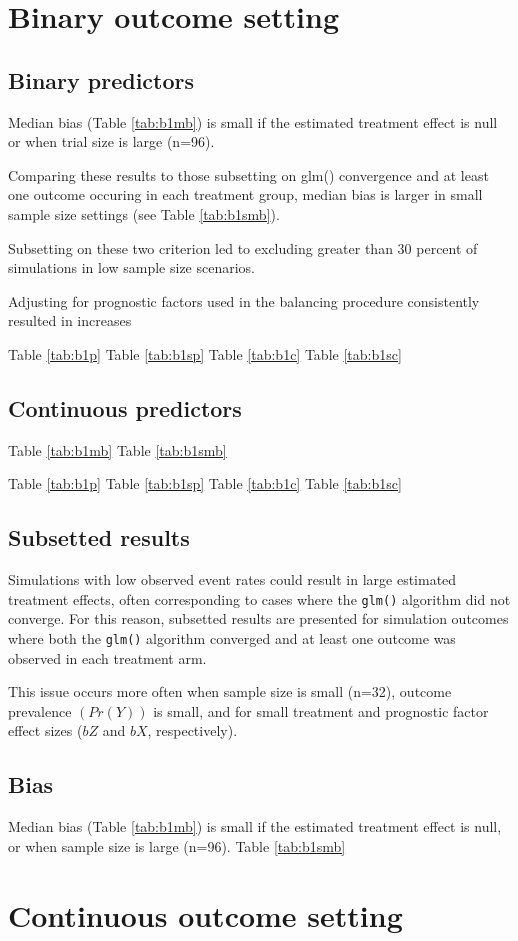\section{Binary outcome setting}
\subsection{Binary predictors}
Median bias (Table \ref{tab:b1mb}) is small if the estimated treatment effect is null or when trial size is large (n=96).

Comparing these results to those subsetting on glm() convergence and at least one outcome occuring in each treatment group,  median bias is larger in small sample size settings (see Table \ref{tab:b1smb}).

Subsetting on these two criterion led to excluding greater than 30 percent of simulations in low sample size scenarios.

Adjusting for prognostic factors used in the balancing procedure consistently resulted in increases 

Table \ref{tab:b1p}
Table \ref{tab:b1sp}
Table \ref{tab:b1c}
Table \ref{tab:b1sc}

\subsection{Continuous predictors}
Table \ref{tab:b1mb}
Table \ref{tab:b1smb}

Table \ref{tab:b1p}
Table \ref{tab:b1sp}
Table \ref{tab:b1c}
Table \ref{tab:b1sc}


\subsection{Subsetted results}
Simulations with low observed event rates could result in large estimated treatment effects, often corresponding to cases where the \texttt{glm()} algorithm did not converge.
For this reason, subsetted results are presented for simulation outcomes where both the \texttt{glm()} algorithm converged and at least one outcome was observed in each treatment arm.

This issue occurs more often when sample size is small (n=32), outcome prevalence $(Pr(Y))$ is small, and for small treatment and prognostic factor effect sizes ($bZ$ and $bX$, respectively).

\subsection{Bias}
Median bias (Table \ref{tab:b1mb}) is small if the estimated treatment effect is null, or when sample size is large (n=96).
Table \ref{tab:b1smb}


\section{Continuous outcome setting}